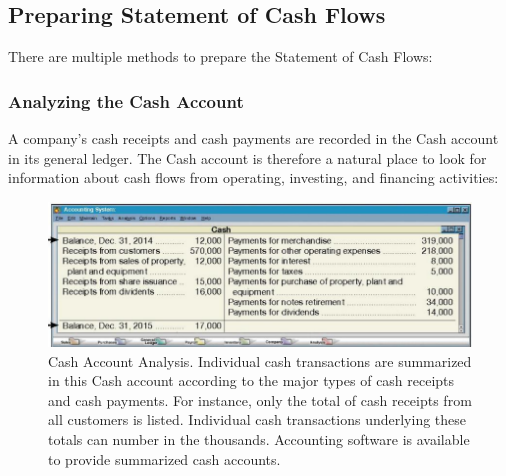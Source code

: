 \documentclass[../main.tex]{subfiles}
\begin{document}
	\subsection{Preparing Statement of Cash Flows}
	
	There are multiple methods to prepare the Statement of Cash Flows:
	
	\subsubsection{Analyzing the Cash Account}
	
	A company’s cash receipts and cash payments are recorded in the Cash 
	account in its general ledger. The Cash account is therefore a natural 
	place to look for information about cash flows from operating, investing, 
	and financing activities:
	
	\begin{figure}[ht]
		\centering
		\includegraphics[width=1\columnwidth]{images/c11/cash_account_analysis.png}
		\caption{\label{fig:cash_account_analysis} Cash Account Analysis. 
		Individual cash transactions are summarized in this Cash account 
		according to the major types of cash receipts and cash payments. For 
		instance, only the total of cash receipts from all customers is listed. 
		Individual cash transactions underlying these totals can number in the 
		thousands. Accounting software is available to provide summarized cash 
		accounts.}
	\end{figure}
	
\end{document}
